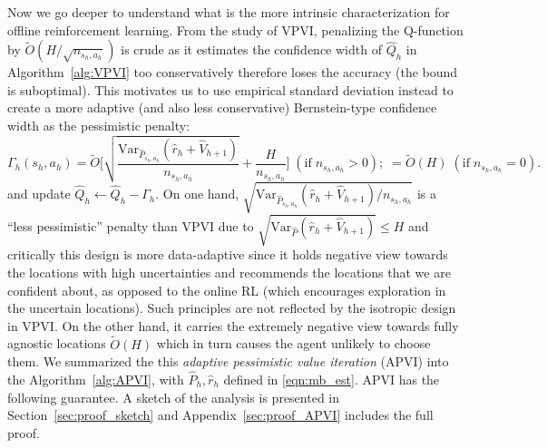 Now we go deeper to understand what is the more intrinsic characterization for offline reinforcement learning. From the study of VPVI, penalizing the Q-function by $\widetilde{O}(H/\sqrt{n_{s_h,a_h}})$ is crude as it estimates the confidence width of $\widehat{Q}_h$ in Algorithm~\ref{alg:VPVI} too conservatively therefore loses the accuracy (the bound is suboptimal). This motivates us to use empirical standard deviation instead to create a more adaptive (and also less conservative) Bernstein-type confidence width as the pessimistic penalty:
{\small
 \begin{equation}\label{eqn:pessimistic_pen}
\Gamma_h(s_h,a_h)=\widetilde{O}\bigg[\sqrt{\frac{\mathrm{Var}_{\widehat{P}_{s_h,a_h}}(\widehat{r}_h+\widehat{V}_{h+1})}{n_{s_h,a_h}}}+\frac{H}{n_{s_h,a_h}}\bigg]\;(\text{if} \;n_{s_h,a_h}>0);\;=\widetilde{O}(H)\;(\text{if} \;n_{s_h,a_h}=0).
\end{equation}
}and update $\widehat{Q}_h\leftarrow\widehat{Q}_h-\Gamma_h$. On one hand, $\sqrt{{\mathrm{Var}_{\widehat{P}_{s_h,a_h}}(\widehat{r}_h+\widehat{V}_{h+1})}/{n_{s_h,a_h}}}$ is a ``less pessimistic'' penalty than VPVI due to $\sqrt{\mathrm{Var}_{\widehat{P}}(\widehat{r}_h+\widehat{V}_{h+1})}\leq H$ and critically this design is more data-adaptive since it holds negative view towards the locations with high uncertainties and recommends the locations that we are confident about, as opposed to the online RL (which encourages exploration in the uncertain locations). Such principles are not reflected by the isotropic design in VPVI. On the other hand, it carries the extremely negative view towards fully agnostic locations $\widetilde{O}(H)$ which in turn causes the agent unlikely to choose them. We summarized the this \emph{adaptive pessimistic value iteration} (APVI) into the Algorithm~\ref{alg:APVI}, with $\widehat{P}_h,\widehat{r}_h$ defined in \eqref{eqn:mb_est}. APVI has the following guarantee. A sketch of the analysis is presented in Section~\ref{sec:proof_sketch} and Appendix~\ref{sec:proof_APVI} includes the full proof. 





